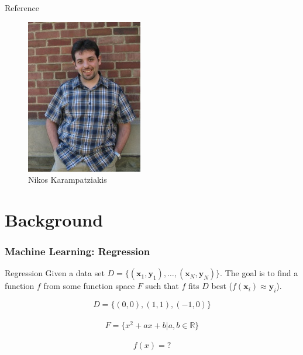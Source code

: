 \documentclass{beamer}
\begin{document}
\begin{frame}{Reference}
\begin{figure}
\begin{minipage}[t]{.2\paperwidth}
        \includegraphics[width=\textwidth]{res/Nikos Karampatziakis.jpg}
        \caption{Nikos Karampatziakis}
    \end{minipage}
\end{figure}

\end{frame}

\section{Background}

\begin{frame}
    \frametitle{Machine Learning: Regression}

    \begin{block}{Regression}
        Given a data set $D = \{(\boldsymbol{x}_1, \boldsymbol{y}_1), \dots, (\boldsymbol{x}_N, \boldsymbol{y}_N)\}$. The goal is to find a function $f$ from some function space $F$ such that
        $f$ fits $D$ best ($f(\boldsymbol{x}_i)\approx \boldsymbol{y}_i$).
    \end{block}

    \begin{example}
        \[D = \{(0, 0), (1, 1), (-1, 0)\}\] \\
        \[F = \{x^2 + ax + b \vert a, b \in \mathbb{R}\}\] \\
        \[f(x) = ?\]
    \end{example}

\end{frame}
\end{document}

